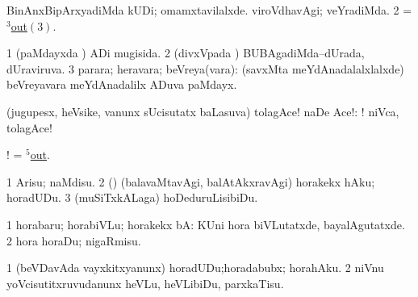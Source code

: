 \noindent
\gl{\pagu}
\bmng
\bnum
{}  
\banum
{} BinAnxBipArxyadiMda kUDi; omamxtavilalxde. 
 viroVdhavAgi; veYradiMda. 
\eanum
\numie
\num{2}  = \hyperlink{out(3)3}{$^3$out\((3)\)}. 
\enum
\emng
\eentry

\bentry
{}
\gl{\gu}
\bmng
\bnum
\num{1} (paMdayxda \vi) ADi mugisida. 
\num{2} (divxVpada \vi) BUBAgadiMda--dUrada, dUraviruva. 
\num{3} parara; heravara; beVreya(vara):  (savxMta meYdAnadalalxlalxde) beVreyavara meYdAnadalilx ADuva paMdayx. 
\enum
\emng
\eentry

\bentry
{}
\gl{\BAavayx}
\bmng
(jugupesx, heVsike, \mo vanunx sUcisutatx baLasuva) tolagAce! naDe Ace!: ! niVca, tolagAce! 
\emng

\noindent
\gl{\pagu}
\bmng
{}! = \hyperlink{out(5)}{$^5$out}. 
\emng
\eentry

\bentry
{}
\gl{\sakirx}
\bmng
\bnum
\num{1} Arisu; naMdisu. 
\num{2} (\AmA) (balavaMtavAgi, balAtAkxravAgi) horakekx hAku; horadUDu. 
\num{3} (muSiTxkALaga) hoDeduruLisibiDu. 
\enum
\emng

\noindent
\gl{\akirx}
\bmng
\bnum
\num{1} horabaru; horabiVLu; horakekx bA:  KUni hora biVLutatxde, bayalAgutatxde. 
\num{2} hora horaDu; nigaRmisu. 
\enum
\emng

\noindent
\gl{\pagu}
\bmng
\bnum
\num{1}  (beVDavAda vayxkitxyanunx) horadUDu;horadabubx; horahAku. 
\num{2}  niVnu yoVcisutitxruvudanunx heVLu, heVLibiDu, parxkaTisu. 
\enum
\emng
\eentry

